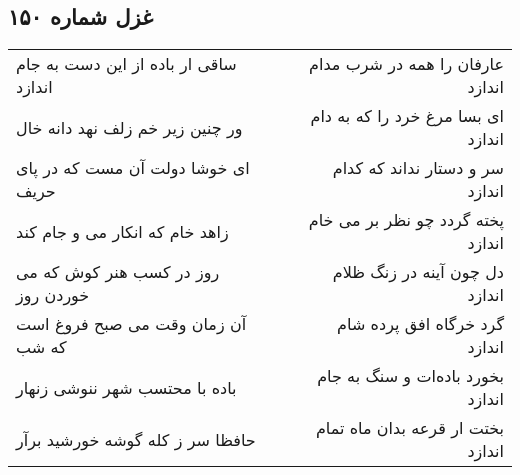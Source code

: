 \begin{center}
\section*{غزل شماره ۱۵۰}
\label{sec:sh150}
\begin{longtable}{l p{0.5cm} r}
ساقی ار باده از این دست به جام اندازد
&&
عارفان را همه در شرب مدام اندازد
\\
ور چنین زیر خم زلف نهد دانه خال
&&
ای بسا مرغ خرد را که به دام اندازد
\\
ای خوشا دولت آن مست که در پای حریف
&&
سر و دستار نداند که کدام اندازد
\\
زاهد خام که انکار می و جام کند
&&
پخته گردد چو نظر بر می خام اندازد
\\
روز در کسب هنر کوش که می خوردن روز
&&
دل چون آینه در زنگ ظلام اندازد
\\
آن زمان وقت می صبح فروغ است که شب
&&
گرد خرگاه افق پرده شام اندازد
\\
باده با محتسب شهر ننوشی زنهار
&&
بخورد باده‌ات و سنگ به جام اندازد
\\
حافظا سر ز کله گوشه خورشید برآر
&&
بختت ار قرعه بدان ماه تمام اندازد
\\
\end{longtable}
\end{center}
